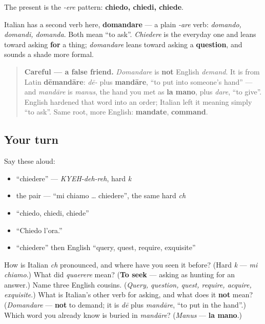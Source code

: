 \begin{grammarlens}[title={Grammar Lens: the present, and the second verb for asking}]
The present is the \emph{-ere} pattern: \textbf{chiedo, chiedi, chiede}.

Italian has a second verb here, \textbf{domandare} — a plain \emph{-are} verb: \emph{domando, domandi, domanda}. Both mean \textquotedblleft{}to ask\textquotedblright{}. \emph{Chiedere} is the everyday one and leans toward asking \textbf{for} a thing; \emph{domandare} leans toward asking a \textbf{question}, and sounds a shade more formal.

\begin{quote}
\textbf{Careful — a false friend.} \emph{Domandare} is \textbf{not} English \emph{demand}. It is from Latin \textbf{dēmandāre}: \emph{dē-} plus \textbf{mandāre}, \textquotedblleft{}to put into someone's hand\textquotedblright{} — and \emph{mandāre} is \emph{manus}, the hand you met as \textbf{la mano}, plus \emph{dare}, \textquotedblleft{}to give\textquotedblright{}. English hardened that word into an order; Italian left it meaning simply \textquotedblleft{}to ask\textquotedblright{}. Same root, more English: \textbf{mandate}, \textbf{command}.
\end{quote}
\end{grammarlens}

\subsection*{Your turn}
Say these aloud:

\begin{itemize}
\raggedright
  \item \textquotedblleft{}chiedere\textquotedblright{} — \emph{KYEH-deh-reh}, hard \emph{k}
  \item the pair — \textquotedblleft{}mi chiamo … chiedere\textquotedblright{}, the same hard \emph{ch}
  \item \textquotedblleft{}chiedo, chiedi, chiede\textquotedblright{}
  \item \textquotedblleft{}Chiedo l'ora.\textquotedblright{}
  \item \textquotedblleft{}chiedere\textquotedblright{} then English \textquotedblleft{}query, quest, require, exquisite\textquotedblright{}
\end{itemize}

\begin{tcolorbox}[breakable,colback=teal!4,colframe=teal!35!black,title={Before you move on}]
How is Italian \emph{ch} pronounced, and where have you seen it before? (Hard \emph{k} — \emph{mi chiamo}.) What did \emph{quaerere} mean? (\textbf{To seek} — asking as hunting for an answer.) Name three English cousins. (\emph{Query, question, quest, require, acquire, exquisite}.) What is Italian's other verb for asking, and what does it \textbf{not} mean? (\emph{Domandare} — \textbf{not} to demand; it is \emph{dē} plus \emph{mandāre}, \textquotedblleft{}to put in the hand\textquotedblright{}.) Which word you already know is buried in \emph{mandāre}? (\emph{Manus} — \textbf{la mano}.)
\end{tcolorbox}
